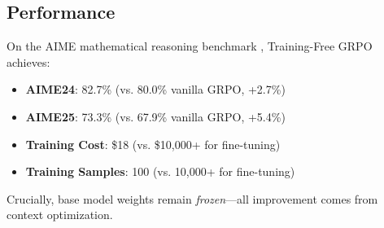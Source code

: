 \subsection{Performance}

On the AIME mathematical reasoning benchmark \cite{hendrycks2021math}, Training-Free GRPO achieves:
\begin{itemize}
\item \textbf{AIME24}: 82.7\% (vs. 80.0\% vanilla GRPO, +2.7\%)
\item \textbf{AIME25}: 73.3\% (vs. 67.9\% vanilla GRPO, +5.4\%)
\item \textbf{Training Cost}: \$18 (vs. \$10,000+ for fine-tuning)
\item \textbf{Training Samples}: 100 (vs. 10,000+ for fine-tuning)
\end{itemize}

Crucially, base model weights remain \textit{frozen}—all improvement comes from context optimization.

